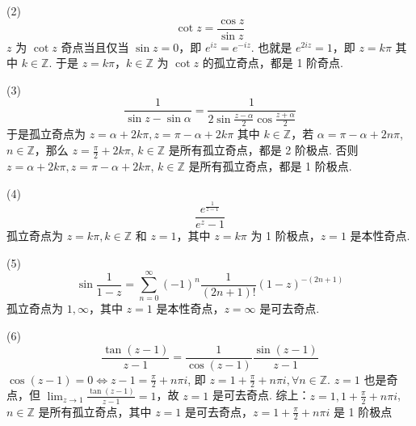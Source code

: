 (2)
\[
\cot z=\frac{\cos z}{\sin z}
\]
$z$ 为 $\cot z$ 奇点当且仅当 $\sin z=0$，即 $e^{ iz }=e^{ -iz }$. 也就是 $e^{ 2iz }=1$，即 $z=k\pi$ 其中 $k\in \mathbb{Z}$. 于是 $z=k\pi$，$k\in \mathbb{Z}$ 为 $\cot z$ 的孤立奇点，都是 1 阶奇点.

(3)
\[
\frac{1}{\sin z-\sin \alpha}=\frac{1}{2\sin\frac{z-\alpha}{2}\cos\frac{z+\alpha}{2}}
\]
于是孤立奇点为 $z=\alpha+2k\pi,z=\pi-\alpha+2k\pi$ 其中 $k\in \mathbb{Z}$，若 $\alpha=\pi-\alpha+2n\pi$, $n\in \mathbb{Z}$，那么 $z=\frac{\pi}{2}+2k\pi$, $k\in \mathbb{Z}$ 是所有孤立奇点，都是 2 阶极点. 否则  $z=\alpha+2k\pi,z=\pi-\alpha+2k\pi$, $k\in \mathbb{Z}$ 是所有孤立奇点，都是 1 阶极点.

(4)
\[
\frac{e^{ \frac{1}{z-1} }}{e^{ z }-1}
\]
孤立奇点为 $z=k\pi, k\in \mathbb{Z}$ 和 $z=1$，其中 $z=k\pi$ 为 1 阶极点，$z=1$ 是本性奇点.

(5)
\[
\sin\frac{1}{1-z}=\sum_{n=0}^{\infty} (-1)^{n}\frac{1}{(2n+1)!}(1-z)^{-(2n+1)}
\]
孤立奇点为 $1,\infty$，其中 $z=1$ 是本性奇点，$z=\infty$ 是可去奇点.

(6)
\[
\frac{\tan (z-1)}{z-1}=\frac{1}{\cos(z-1)}\frac{\sin(z-1)}{z-1}
\]
$\cos (z-1)=0\iff z-1=\frac{\pi}{2}+n\pi i$, 即 $z=1+\frac{\pi}{2}+n\pi i,\forall n\in \mathbb{Z}$. $z=1$ 也是奇点，但 $\lim_{ z \to 1 }\frac{\tan(z-1)}{z-1}=1$，故 $z=1$ 是可去奇点. 综上：$z=1,1+\frac{\pi}{2}+n\pi i$, $n\in \mathbb{Z}$ 是所有孤立奇点，其中 $z=1$ 是可去奇点，$z=1+\frac{\pi}{2}+n\pi i$ 是 1 阶极点
